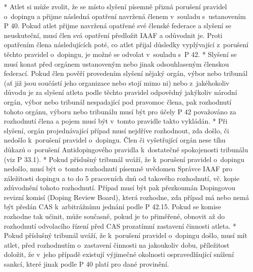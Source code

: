 * Atlet si může zvolit, že se místo slyšení písemně přizná porušení pravidel o~dopingu a přijme následná opatření navržená členem v~souladu s~ustanovením P 40. Pokud atlet přijme navržená opatřené své členské federace a slyšení se neuskuteční, musí člen svá opatření předložit IAAF a odůvodnit je. Proti opatřením člena následujících poté, co atlet přijal důsledky vyplývající z~porušení těchto pravidel o~dopingu, je možné se odvolat v~souladu s~P 42.
* Slyšení se musí konat před orgánem ustanoveným nebo jinak odsouhlaseným členskou federací. Pokud člen pověří provedením slyšení nějaký orgán, výbor nebo tribunál (ať již jsou součástí jeho organizace nebo stojí mimo ni) nebo z~jakéhokoliv důvodu je za slyšení atleta podle těchto pravidel odpovědný jakýkoliv národní orgán, výbor nebo tribunál nespadající pod pravomoc člena, pak rozhodnutí tohoto orgánu, výboru nebo tribunálu musí být pro účely P 42 považováno za rozhodnutí člena a pojem  musí být v~tomto pravidle takto vykládán.
* Při slyšení, orgán projednávající případ musí nejdříve rozhodnout, zda došlo, či nedošlo k~porušení pravidel o~dopingu. Člen či vyšetřující orgán nese tíhu důkazů o~porušení Antidopingového pravidla k~dostatečné spokojenosti tribunálu (viz P 33.1).
* Pokud příslušný tribunál uváží, že k~porušení pravidel o~dopingu nedošlo, musí být o~tomto rozhodnutí písemně uvědomen Správce IAAF pro záležitosti dopingu a to do 5 pracovních dnů od takového rozhodnutí, vč. kopie zdůvodnění tohoto rozhodnutí. Případ musí být pak přezkoumán Dopingovou revizní komisí (Doping Review Board), která rozhodne, zda případ má nebo nemá být předán CAS k~arbitrážnímu jednání podle P 42.15. Pokud se komise rozhodne tak učinit, může současně, pokud je to přiměřené, obnovit až do rozhodnutí odvolacího řízení před CAS prozatímní zastavení činnosti atleta.
* Pokud příslušný tribunál uváží, že k~porušení pravidel o~dopingu došlo, musí mít atlet, před rozhodnutím o~zastavení činnosti na jakoukoliv dobu, příležitost doložit, že v~jeho případě existují výjimečné okolnosti ospravedlňující snížení sankcí, které jinak podle P 40 platí pro dané provinění.

